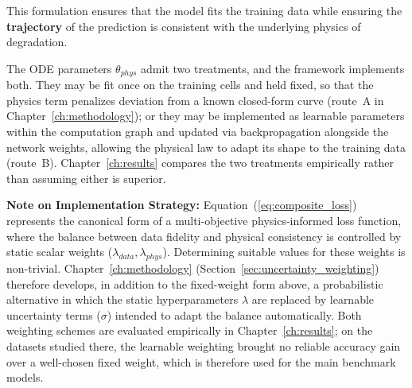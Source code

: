 This formulation ensures that the model fits the training data while ensuring the \textbf{trajectory} of the prediction is consistent with the underlying physics of degradation.

The ODE parameters $\theta_{phys}$ admit two treatments, and the framework implements both. They may be fit once on the training cells and held fixed, so that the physics term penalizes deviation from a known closed-form curve (route~A in Chapter~\ref{ch:methodology}); or they may be implemented as learnable parameters within the computation graph and updated via backpropagation alongside the network weights, allowing the physical law to adapt its shape to the training data (route~B). Chapter~\ref{ch:results} compares the two treatments empirically rather than assuming either is superior.

\par\medskip
\noindent \textbf{Note on Implementation Strategy:} 
Equation~(\ref{eq:composite_loss}) represents the canonical form of a multi-objective physics-informed loss function, where the balance between data fidelity and physical consistency is controlled by static scalar weights ($\lambda_{data}, \lambda_{phys}$). Determining suitable values for these weights is non-trivial. Chapter~\ref{ch:methodology} (Section~\ref{sec:uncertainty_weighting}) therefore develops, in addition to the fixed-weight form above, a probabilistic alternative in which the static hyperparameters $\lambda$ are replaced by learnable uncertainty terms ($\sigma$) intended to adapt the balance automatically. Both weighting schemes are evaluated empirically in Chapter~\ref{ch:results}; on the datasets studied there, the learnable weighting brought no reliable accuracy gain over a well-chosen fixed weight, which is therefore used for the main benchmark models.